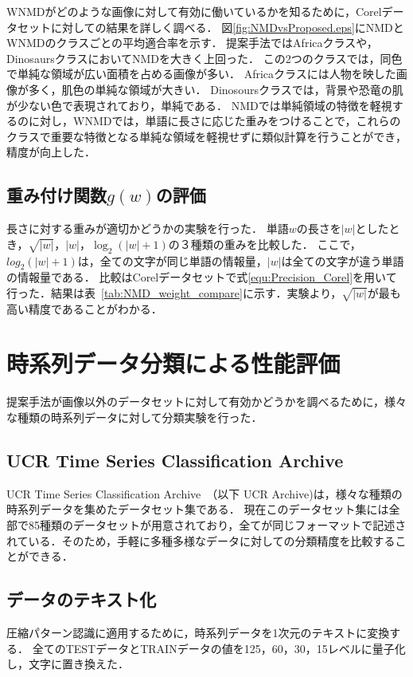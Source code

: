 WNMDがどのような画像に対して有効に働いているかを知るために，Corelデータセットに対しての結果を詳しく調べる．
図\ref{fig:NMDvsProposed.eps}にNMDとWNMDのクラスごとの平均適合率を示す．
提案手法ではAfricaクラスや，DinosaursクラスにおいてNMDを大きく上回った．
この2つのクラスでは，同色で単純な領域が広い面積を占める画像が多い．
Africaクラスには人物を映した画像が多く，肌色の単純な領域が大きい．
Dinosoursクラスでは，背景や恐竜の肌が少ない色で表現されており，単純である．
NMDでは単純領域の特徴を軽視するのに対し，WNMDでは，単語に長さに応じた重みをつけることで，これらのクラスで重要な特徴となる単純な領域を軽視せずに類似計算を行うことができ，精度が向上した．
\subsection{重み付け関数$g(w)$の評価} %
\label{sub:重み付け関数}
長さに対する重みが適切かどうかの実験を行った．
単語$w$の長さを$|w|$としたとき，$\sqrt{|w|}$，$|w|$，$\log_2 (|w|+1)$の３種類の重みを比較した．
ここで，$log_2(|w|+1)$は，全ての文字が同じ単語の情報量，$|w|$は全ての文字が違う単語の情報量である．
比較はCorelデータセットで式\ref{equ:Precision_Corel}を用いて行った．結果は表~\ref{tab:NMD_weight_compare}に示す．実験より，$\sqrt{|w|}$が最も高い精度であることがわかる．


\section{時系列データ分類による性能評価} %
\label{sub:時系列データ分類による性能評価}
提案手法が画像以外のデータセットに対して有効かどうかを調べるために，様々な種類の時系列データに対して分類実験を行った．
\subsection{UCR Time Series Classification Archive} %
\label{sub:UCR Time Series Classification Archive}
UCR Time Series Classification Archive~\cite{UCRArchive}（以下 UCR Archive)は，様々な種類の時系列データを集めたデータセット集である．
現在このデータセット集には全部で85種類のデータセットが用意されており，全てが同じフォーマットで記述されている．そのため，手軽に多種多様なデータに対しての分類精度を比較することができる．
\subsection{データのテキスト化} %
\label{sub:データのテキスト化}
圧縮パターン認識に適用するために，時系列データを1次元のテキストに変換する．
全てのTESTデータとTRAINデータの値を125，60，30，15レベルに量子化し，文字に置き換えた．

